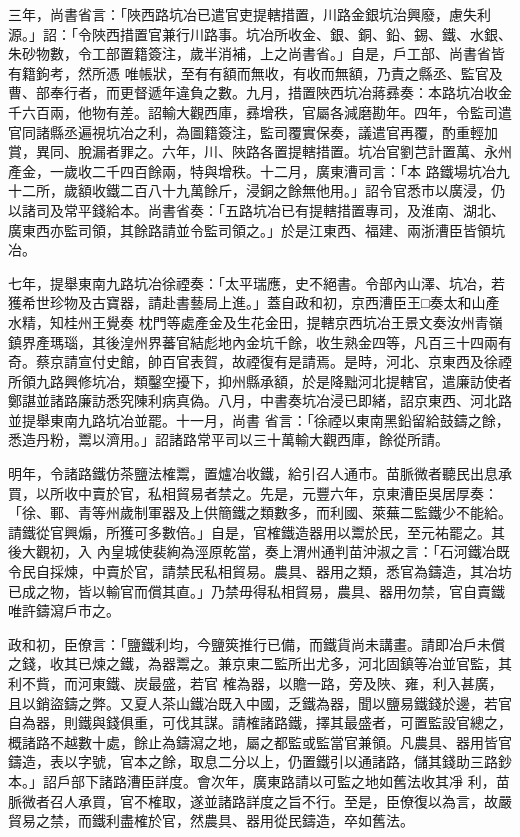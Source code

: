 \begin{pinyinscope}
 三年，尚書省言：「陜西路坑冶已遣官吏提轄措置，川路金銀坑治興廢，慮失利源。」詔：「令陜西措置官兼行川路事。坑冶所收金、銀、銅、鉛、錫、鐵、水銀、朱砂物數，令工部置籍簽注，歲半消補，上之尚書省。」自是，戶工部、尚書省皆有籍鉤考，然所憑
 唯帳狀，至有有額而無收，有收而無額，乃責之縣丞、監官及曹、部奉行者，而更督遞年違負之數。九月，措置陜西坑冶蔣彞奏：本路坑冶收金千六百兩，他物有差。詔輸大觀西庫，彞增秩，官屬各減磨勘年。四年，令監司遣官同諸縣丞遍視坑冶之利，為圖籍簽注，監司覆實保奏，議遣官再覆，酌重輕加賞，異同、脫漏者罪之。六年，川、陜路各置提轄措置。坑冶官劉芑計置萬、永州產金，一歲收二千四百餘兩，特與增秩。十二月，廣東漕司言：「本
 路鐵場坑冶九十二所，歲額收鐵二百八十九萬餘斤，浸銅之餘無他用。」詔令官悉市以廣浸，仍以諸司及常平錢給本。尚書省奏：「五路坑冶已有提轄措置專司，及淮南、湖北、廣東西亦監司領，其餘路請並令監司領之。」於是江東西、福建、兩浙漕臣皆領坑冶。



 七年，提舉東南九路坑冶徐禋奏：「太平瑞應，史不絕書。令部內山澤、坑冶，若獲希世珍物及古寶器，請赴書藝局上進。」蓋自政和初，京西漕臣王□奏太和山產水精，知桂州王覺奏
 枕門等處產金及生花金田，提轄京西坑冶王景文奏汝州青嶺鎮界產瑪瑙，其後湟州界蕃官結彪地內金坑千餘，收生熟金四等，凡百三十四兩有奇。蔡京請宣付史館，帥百官表賀，故禋復有是請焉。是時，河北、京東西及徐禋所領九路興修坑冶，類鑿空擾下，抑州縣承額，於是降黜河北提轄官，遣廉訪使者鄭諶並諸路廉訪悉究陳利病真偽。八月，中書奏坑冶浸已即緒，詔京東西、河北路並提舉東南九路坑冶並罷。十一月，尚書
 省言：「徐禋以東南黑鉛留給鼓鑄之餘，悉造丹粉，鬻以濟用。」詔諸路常平司以三十萬輸大觀西庫，餘從所請。



 明年，令諸路鐵仿茶鹽法榷鬻，置爐冶收鐵，給引召人通市。苗脈微者聽民出息承買，以所收中賣於官，私相貿易者禁之。先是，元豐六年，京東漕臣吳居厚奏：「徐、鄆、青等州歲制軍器及上供簡鐵之類數多，而利國、萊蕪二監鐵少不能給。請鐵從官興煽，所獲可多數倍。」自是，官榷鐵造器用以鬻於民，至元祐罷之。其後大觀初，入
 內皇城使裴絢為涇原乾當，奏上渭州通判苗沖淑之言：「石河鐵冶既令民自採煉，中賣於官，請禁民私相貿易。農具、器用之類，悉官為鑄造，其冶坊已成之物，皆以輸官而償其直。」乃禁毋得私相貿易，農具、器用勿禁，官自賣鐵唯許鑄瀉戶市之。



 政和初，臣僚言：「鹽鐵利均，今鹽筴推行已備，而鐵貨尚未講畫。請即冶戶未償之錢，收其已煉之鐵，為器鬻之。兼京東二監所出尤多，河北固鎮等冶並官監，其利不貲，而河東鐵、炭最盛，若官
 榷為器，以贍一路，旁及陜、雍，利入甚廣，且以銷盜鑄之弊。又夏人茶山鐵冶既入中國，乏鐵為器，聞以鹽易鐵錢於邊，若官自為器，則鐵與錢俱重，可伐其謀。請榷諸路鐵，擇其最盛者，可置監設官總之，概諸路不越數十處，餘止為鑄瀉之地，屬之都監或監當官兼領。凡農具、器用皆官鑄造，表以字號，官本之餘，取息二分以上，仍置鐵引以通諸路，儲其錢助三路鈔本。」詔戶部下諸路漕臣詳度。會次年，廣東路請以可監之地如舊法收其凈
 利，苗脈微者召人承買，官不榷取，遂並諸路詳度之旨不行。至是，臣僚復以為言，故嚴貿易之禁，而鐵利盡榷於官，然農具、器用從民鑄造，卒如舊法。




\end{pinyinscope}
